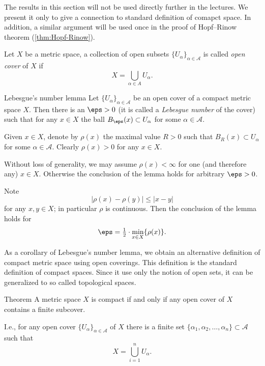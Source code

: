 The results in this section will not be used directly further in the lectures.
We present it only to give a connection to standard definition of comapct space.
In addition, a similar argument will be used once in the proof of Hopf--Rinow theorem (\ref{thm:Hopf-Rinow}).

\medskip

Let $X$ be a metric space, a collection of open subsets $\{U_\alpha\}_{\alpha\in\mathcal A}$ is called \emph{open cover} of $X$ if 
$$X=\bigcup_{\alpha\in A}U_\alpha.$$


\begin{thm}{Lebesgue's number lemma}\label{lem:lebesgue-number}
Let $\{U_\alpha\}_{\alpha\in\mathcal A}$ be an open cover of a compact metric space $X$.
Then there is an $\eps>0$ (it is called a \emph{Lebesgue number} of the cover)
such that for any $x\in X$ the ball $B_\eps(x)\subset U_\alpha$ for some $\alpha\in\mathcal{A}$.
\end{thm}

Given $x\in X$, denote by $\rho(x)$ the maximal value $R>0$ such that $B_R(x)\subset U_\alpha$ for some $\alpha\in\mathcal{A}$.
Clearly $\rho(x)>0$ for any $x\in X$.

Without loss of generality, we may assume $\rho(x)<\infty$ for one (and therefore any) $x\in X$.
Otherwise the conclusion of the lemma holds for arbitrary $\eps>0$.

Note  $$|\rho(x)-\rho(y)|\le |x-y|$$ for any $x,y\in X$;
in particular $\rho$ is continuous.
Then the conclusion of the lemma holds for 
$$\eps=\tfrac12\cdot\min_{x\in X}\{\rho(x)\}.$$
\qedsf


As a corollary of Lebesgue's number lemma, 
we obtain an alternative definition of compact metric space using open coverings.
This definition is the standard definition of compact spaces.
Since it use only the notion of open sets, it can be generalized to so called topological spaces.


\begin{thm}{Theorem}\label{thm:compact+covering}
A metric space $X$ is compact if and only if any open cover of $X$ contains a finite subcover.

I.e., for any open cover $\{U_\alpha\}_{\alpha\in\mathcal A}$ of $X$ there is a finite set 
$\{\alpha_1,\alpha_2,\dots,\alpha_n\}\subset \mathcal A$ such that 
$$X=\bigcup_{i=1}^nU_\alpha.$$
 
\end{thm}

